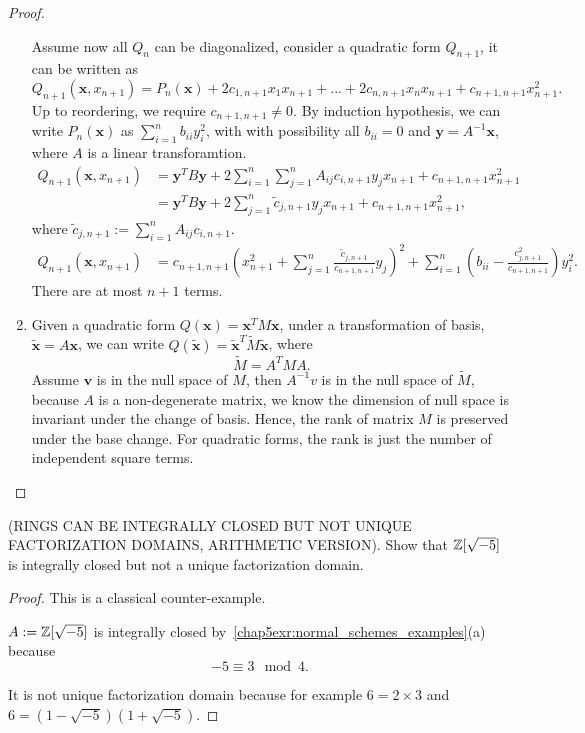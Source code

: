 \documentclass[11pt]{book} %
\begin{document}
\begin{proof}
\begin{enumerate}[label=(\alph*)]
Assume now all $Q_n$ can be diagonalized, consider a quadratic form $Q_{n+1}$, it can be written as 
$$
Q_{n+1}(\mathbf{x},x_{n+1})=P_{n}(\mathbf{x})+2c_{1,n+1}x_1x_{n+1}+...+2c_{n,n+1}x_nx_{n+1}+c_{n+1,n+1}x_{n+1}^2.
$$
Up to reordering, we require $c_{n+1,n+1}\neq 0$.
By induction hypothesis, we can write $P_n(\mathbf{x})$ as $\sum_{i=1}^n b_{ii}y_i^2$, with with possibility all $b_{ii}=0$ and $\mathbf{y}=A^{-1}\mathbf{x}$, where $A$ is a linear transforamtion.
$$
\begin{aligned}
Q_{n+1}(\mathbf{x},x_{n+1})&=\mathbf{y}^{T}B\mathbf{y}+2\sum_{i=1}^n\sum_{j=1}^n A_{ij}c_{i,n+1}y_jx_{n+1}+c_{n+1,n+1}x_{n+1}^2\\
&=\mathbf{y}^{T}B\mathbf{y}+2\sum_{j=1}^n \tilde{c}_{j,n+1}y_jx_{n+1}+c_{n+1,n+1}x_{n+1}^2,
\end{aligned}
$$ 
where $\tilde{c}_{j,n+1}:=\sum_{i=1}^nA_{ij} c_{i,n+1}$.
$$
\begin{aligned}
Q_{n+1}(\mathbf{x},x_{n+1})
&=c_{n+1,n+1}\left(x_{n+1}^2+\sum_{j=1}^n\frac{\tilde{c}_{j,n+1}}{c_{n+1,n+1}}y_j\right)^2+\sum_{i=1}^n\left(b_{ii}-\frac{c_{j,n+1}^2}{c_{n+1,n+1}}\right) y_i^2.
\end{aligned}
$$ 
There are at most $n+1$ terms.
\item Given a quadratic form $Q(\mathbf{x})=\mathbf{x}^{T}M\mathbf{x}$, under a transformation of basis, $\tilde{\mathbf{x}}=A \mathbf{x}$, we can write $Q(\tilde{\mathbf{x}})=\tilde{\mathbf{x}}^T \tilde{M} \tilde{\mathbf{x}}$, where 
$$
\tilde{M}=A^{T}M A.
$$
Assume $\mathbf{v}$ is in the null space of $M$, then $A^{-1}v$ is  in the null space of $\tilde{M}$, because $A$ is a non-degenerate matrix, we know the dimension of  null space is invariant under the change of basis. Hence, the rank of matrix $M$ is preserved under the base change. For quadratic forms, the rank is just the number of independent square terms.
\end{enumerate}
\end{proof}

\begin{exr}
(RINGS CAN BE INTEGRALLY CLOSED BUT NOT UNIQUE FACTORIZATION DOMAINS, ARITHMETIC VERSION). Show that $\mathbb Z[\sqrt{-5}]$ is integrally closed but not a unique factorization domain.
\end{exr}
\begin{proof}
This is a classical counter-example.

 $A:=\mathbb Z[\sqrt{-5}]$ is integrally closed by~\ref{chap5exr:normal_schemes_examples}(a) because 
 $$-5\equiv 3\mod 4.
 $$

 It is not unique factorization domain because for example $6=2\times 3$ and $6=(1-\sqrt{-5})(1+\sqrt{-5})$.
\end{proof}
\end{document}
